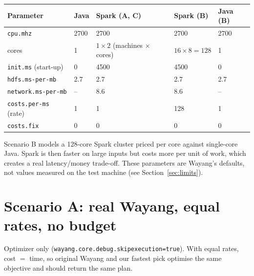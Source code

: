 \documentclass[10pt,a4paper]{article}
\begin{document}
\begin{center}\small
\begin{tabular}{@{}lll|ll@{}}
\toprule
Parameter & Java & Spark (A, C) & Spark (B) & Java (B)\\
\midrule
\texttt{cpu.mhz} & 2700 & 2700 & 2700 & 2700\\
cores & 1 & $1\times2$ (machines $\times$ cores) & $16\times8 = 128$ & 1\\
\texttt{init.ms} (start-up) & 0 & 4500 & 4500 & 0\\
\texttt{hdfs.ms-per-mb} & 2.7 & 2.7 & 2.7 & 2.7\\
\texttt{network.ms-per-mb} & -- & 8.6 & 8.6 & --\\
\texttt{costs.per-ms} (rate) & 1 & 1 & 128 & 1\\
\texttt{costs.fix} & 0 & 0 & 0 & 0\\
\bottomrule
\end{tabular}
\end{center}
Scenario B models a 128-core Spark cluster priced per core against single-core Java. Spark is then faster on large
inputs but costs more per unit of work, which creates a real latency/money trade-off. These parameters are
Wayang's defaults, not values measured on the test machine (see Section~\ref{sec:limits}).

\section{Scenario A: real Wayang, equal rates, no budget}
Optimizer only (\texttt{wayang.core.debug.skipexecution=true}). With equal rates, cost $=$ time, so original Wayang
and our fastest pick optimise the same objective and should return the same plan.
\end{document}

